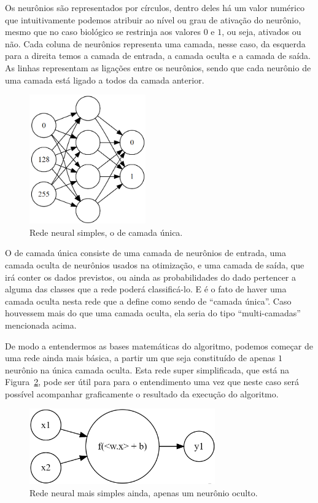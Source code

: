 Os neurônios são representados por círculos, dentro deles há um valor numérico que intuitivamente podemos atribuir ao nível ou grau de ativação do neurônio, mesmo que no caso biológico se restrinja aos valores $0$ e $1$, ou seja, ativados ou não. Cada coluna de neurônios representa uma camada, nesse caso, da esquerda para a direita temos a camada de entrada, a camada oculta e a camada de saída. As linhas representam as ligações entre os neurônios, sendo que cada neurônio de uma camada está ligado a todos da camada anterior.

\begin{figure}[htb]
\centering
\includegraphics[width=5cm]{figuras/perceptron}
\caption{Rede neural simples, o  de camada única.}
\label{fig:perceptron}
\end{figure}

O  de camada única consiste de uma camada de neurônios de entrada, uma camada oculta de neurônios usados na otimização, e uma camada de saída, que irá conter os dados previstos, ou ainda as probabilidades do dado pertencer a alguma das classes que a rede poderá classificá-lo. E é o fato de haver uma camada oculta nesta rede que a define como sendo de ``camada única''. Caso houvessem mais do que uma camada oculta, ela seria do tipo ``multi-camadas'' mencionada acima.

De modo a entendermos as bases matemáticas do algoritmo, podemos começar de uma rede ainda mais básica, a partir um  que seja constituído de apenas $1$ neurônio na única camada oculta. Esta rede super simplificada, que está na Figura~\ref{fig:neuronio}, pode ser útil para para o entendimento uma vez que neste caso será possível acompanhar graficamente o resultado da execução do algoritmo.

\begin{figure}[htb]
\centering
\includegraphics[width=8cm]{figuras/neuronio}
\caption{Rede neural mais simples ainda, apenas um neurônio oculto.}
\label{fig:neuronio}
\end{figure}

